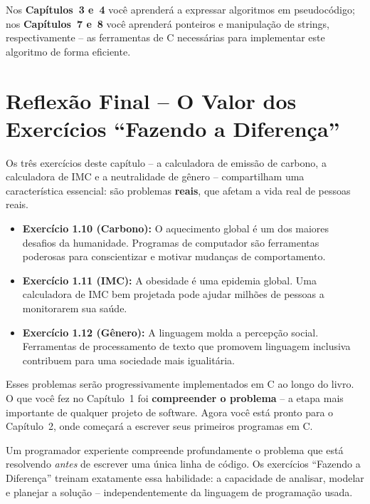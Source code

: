 \documentclass[12pt,a4paper]{article}
\begin{document}
Nos \textbf{Capítulos~3 e~4} você aprenderá a expressar algoritmos em pseudocódigo;
nos \textbf{Capítulos~7 e~8} você aprenderá ponteiros e manipulação de strings,
respectivamente -- as ferramentas de C necessárias para implementar este algoritmo
de forma eficiente.

\newpage

\section*{Reflexão Final -- O Valor dos Exercícios ``Fazendo a Diferença''}

\begin{tcolorbox}[colback=ecolightgreen, colframe=ecogreen,
  title={\bfseries Por que esses exercícios importam?}]

Os três exercícios deste capítulo -- a calculadora de emissão de carbono, a
calculadora de IMC e a neutralidade de gênero -- compartilham uma característica
essencial: são problemas \textbf{reais}, que afetam a vida real de pessoas reais.

\begin{itemize}
  \item \textbf{Exercício 1.10 (Carbono):} O aquecimento global é um dos maiores
  desafios da humanidade. Programas de computador são ferramentas poderosas para
  conscientizar e motivar mudanças de comportamento.

  \item \textbf{Exercício 1.11 (IMC):} A obesidade é uma epidemia global. Uma
  calculadora de IMC bem projetada pode ajudar milhões de pessoas a monitorarem
  sua saúde.

  \item \textbf{Exercício 1.12 (Gênero):} A linguagem molda a percepção social.
  Ferramentas de processamento de texto que promovem linguagem inclusiva contribuem
  para uma sociedade mais igualitária.
\end{itemize}

Esses problemas serão progressivamente implementados em C ao longo do livro.
O que você fez no Capítulo~1 foi \textbf{compreender o problema} -- a etapa mais
importante de qualquer projeto de software. Agora você está pronto para o
Capítulo~2, onde começará a escrever seus primeiros programas em C.
\end{tcolorbox}

\bigskip

\begin{boaprática}
  Um programador experiente compreende profundamente o problema que está resolvendo
  \textit{antes} de escrever uma única linha de código. Os exercícios ``Fazendo a
  Diferença'' treinam exatamente essa habilidade: a capacidade de analisar, modelar
  e planejar a solução -- independentemente da linguagem de programação usada.
\end{boaprática}
\end{document}
